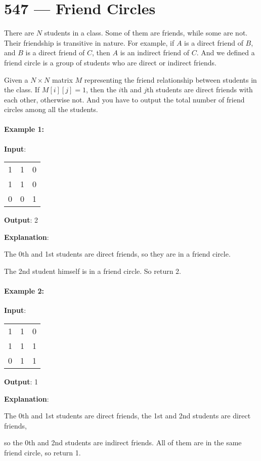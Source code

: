 \section{547 --- Friend Circles}
There are $ N $ students in a class. Some of them are friends, while some are not. Their friendship is transitive in nature. For example, if $ A $ is a direct friend of $ B $, and $ B $ is a direct friend of $ C $, then $ A $ is an indirect friend of $ C $. And we defined a friend circle is a group of students who are direct or indirect friends.

Given a $N\times N$ matrix $ M $ representing the friend relationship between students in the class. If $M[i][j] = 1$, then the $i$th and $j$th students are direct friends with each other, otherwise not. And you have to output the total number of friend circles among all the students.

\paragraph{Example 1:}
\begin{flushleft}

\textbf{Input}:
\begin{table}[H]
\begin{tabular}{ccc}
1 & 1 & 0\\
1 & 1 & 0\\
0 & 0 & 1
\end{tabular}
\end{table} 

\textbf{Output}: 2

\textbf{Explanation}:

The 0th and 1st students are direct friends, so they are in a friend circle. 

The 2nd student himself is in a friend circle. So return 2.
\end{flushleft}

\paragraph{Example 2:}
\begin{flushleft}

\textbf{Input}:
\begin{table}[H]
\begin{tabular}{ccc}
1 & 1 & 0\\
1 & 1 & 1\\
0 & 1 & 1
\end{tabular}
\end{table} 

\textbf{Output}: 1

\textbf{Explanation}:

The 0th and 1st students are direct friends, the 1st and 2nd students are direct friends, 

so the 0th and 2nd students are indirect friends. All of them are in the same friend circle, so return 1.
\end{flushleft}

